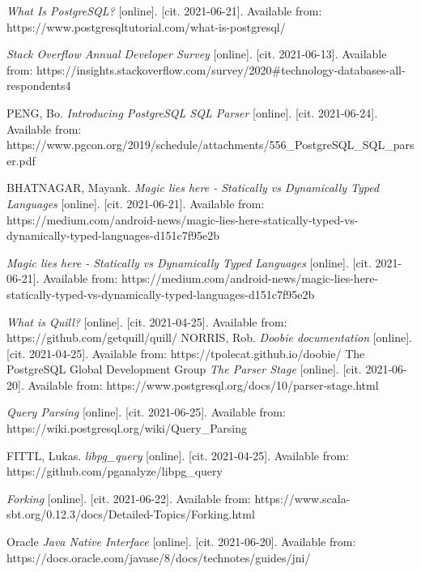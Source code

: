 \documentclass[thesis=B,english]{FITthesis}[2019/12/23]
\begin{document}


\begin{thebibliography}{9}

\textit {What Is PostgreSQL?} [online]. [cit. 2021-06-21]. Available from:
https://www.postgresqltutorial.com/what-is-postgresql/

\textit {Stack Overflow Annual Developer Survey} [online]. [cit. 2021-06-13]. Available from: https://insights.stackoverflow.com/survey/2020\#technology-databases-all-respondents4

PENG, Bo.
\textit {Introducing PostgreSQL SQL Parser} [online]. [cit. 2021-06-24]. Available from:
https://www.pgcon.org/2019/schedule/attachments/556\_PostgreSQL\_SQL\_parser.pdf

BHATNAGAR, Mayank.
\textit {Magic lies here - Statically vs Dynamically Typed Languages} [online]. [cit. 2021-06-21]. Available from: https://medium.com/android-news/magic-lies-here-statically-typed-vs-dynamically-typed-languages-d151c7f95e2b


\textit {Magic lies here - Statically vs Dynamically Typed Languages} [online]. [cit. 2021-06-21]. Available from:
https://medium.com/android-news/magic-lies-here-statically-typed-vs-dynamically-typed-languages-d151c7f95e2b

\textit {What is Quill?} [online]. [cit. 2021-04-25]. Available from: https://github.com/getquill/quill/
NORRIS, Rob. 
\textit {Doobie documentation} [online]. [cit. 2021-04-25]. Available from: https://tpolecat.github.io/doobie/
The PostgreSQL Global Development Group
\textit{The Parser Stage} [online]. [cit. 2021-06-20]. Available from: https://www.postgresql.org/docs/10/parser-stage.html

\textit {Query Parsing} [online]. [cit. 2021-06-25]. Available from:
https://wiki.postgresql.org/wiki/Query\_Parsing

FITTL, Lukas.
\textit {libpg\_query} [online]. [cit. 2021-04-25]. Available from:
https://github.com/pganalyze/libpg\_query

\textit {Forking} [online]. [cit. 2021-06-22]. Available from:
https://www.scala-sbt.org/0.12.3/docs/Detailed-Topics/Forking.html

Oracle
\textit{Java Native Interface} [online]. [cit. 2021-06-20]. Available from:
https://docs.oracle.com/javase/8/docs/technotes/guides/jni/


\end{thebibliography}
\end{document}
